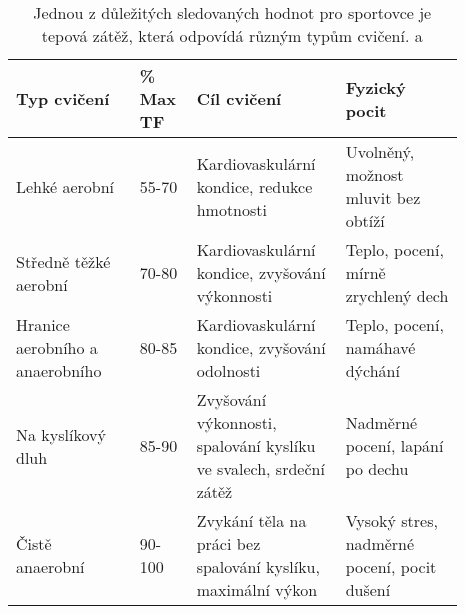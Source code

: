 \begin{table}[ht]
    \centering
    \begin{tabular}{p{0.25\linewidth} | p{0.1\linewidth} | p{0.30\linewidth} | p{0.24\linewidth}}
        \textbf{Typ cvičení}            & \textbf{\% Max TF} & \textbf{Cíl cvičení}                                              & \textbf{Fyzický pocit}              \\ \hline
        Lehké aerobní                   & 55-70                    & Kardiovaskulární kondice, redukce hmotnosti                       & Uvolněný, možnost mluvit bez obtíží \\
        Středně těžké aerobní           & 70-80                    & Kardiovaskulární kondice, zvyšování výkonnosti                    & Teplo, pocení, mírně zrychlený dech \\
        Hranice aerobního a anaerobního & 80-85                    & Kardiovaskulární kondice, zvyšování odolnosti                     & Teplo, pocení, namáhavé dýchání     \\
        Na kyslíkový dluh               & 85-90                    & Zvyšování výkonnosti, spalování kyslíku ve svalech, srdeční zátěž & Nadměrné pocení, lapání po dechu    \\
        Čistě anaerobní                 & 90-100                   & Zvykání těla na práci bez spalování kyslíku, maximální výkon      & Vysoký stres, nadměrné pocení, pocit dušení
    \end{tabular}
    \caption[Typy cvičení podle maximální tepové frekvence]{Jednou z důležitých sledovaných hodnot pro sportovce je tepová zátěž, která odpovídá různým typům cvičení. \cite{skripta} a \cite{tep}}
    \label{tab:MTF}
\end{table}
